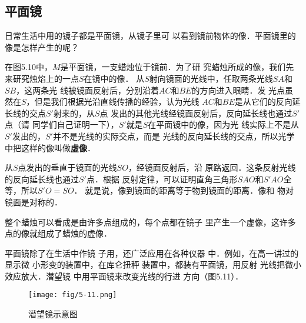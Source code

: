     \subsection{平面镜}

    日常生活中用的镜子都是平面镜，从镜子里可
    以看到镜前物体的像．平面镜里的像是怎样产生的呢？

    在图5.10中，$M$是平面镜，一支蜡烛位于镜前．为了研
    究蜡烛所成的像，我们先来研究烛焰上的一点$S$在镜中的像．
    从$S$射向镜面的光线中，任取两条光线$SA$和$SB$，这两条光
    线被镜面反射后，分别沿着$AC$和$BE$的方向进入眼睛．发
    光点虽然在$S$，但是我们根据光沿直线传播的经验，认为光线
    $AC$和$BE$是从它们的反向延长线的交点$S'$射来的，从$S$点
    发出的其他光线经镜面反射后，反向延长线也通过$S'$点（请
    同学们自己证明一下），$S'$就是$S$在平面镜中的像，因为光
    线实际上不是从$S'$发出的，$S'$并不是光线的实际交点，而是
    光线的反向延长线的交点，所以光学中把这样的像叫做\textbf{虚像}．

    从$S$点发出的垂直于镜面的光线$SO$，经镜面反射后，沿
    原路返回．这条反射光线的反向延长线也通过$S'$点．根据
    反射定律，可以证明直角三角形$SAO$和$S'AO$全等，所以$S'O=SO$．
    就是说，像到镜面的距离等于物到镜面的距离．像和
    物对镜面是对称的．

    整个蜡烛可以看成是由许多点组成的，每个点都在镜子
    里产生一个虚像，这许多点的像就组成了蜡烛的虚像．

    平面镜除了在生活中作镜
    子用，还广泛应用在各种仪器
    中．例如，在高一讲过的显示微
    小形变的装置中，在库仑扭秤
    装置中，都装有平面镜，用反射
    光线把微小效应放大．潜望镜
    中用平面镜来改变光线的行进
    方向（图5.11）．
    \begin{figure}[htp]\centering
        \texttt{[image: fig/5-11.png]}
        \caption{潜望镜示意图}
    \end{figure}

